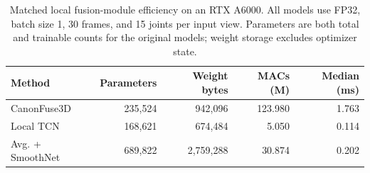 \begin{table}[htbp]
\centering
\caption{Matched local fusion-module efficiency on an RTX A6000. All models use FP32, batch size 1, 30 frames, and 15 joints per input view. Parameters are both total and trainable counts for the original models; weight storage excludes optimizer state.}
\label{tab:local_fusion_efficiency}
\small
\setlength{\tabcolsep}{4pt}
\begin{tabular}{lrrrr}
\toprule
Method & Parameters & Weight bytes & MACs (M) & Median (ms) \\
\midrule
CanonFuse3D & 235,524 & 942,096 & 123.980 & 1.763 \\
Local TCN & 168,621 & 674,484 & 5.050 & 0.114 \\
Avg. + SmoothNet & 689,822 & 2,759,288 & 30.874 & 0.202 \\
\bottomrule
\end{tabular}
\end{table}
